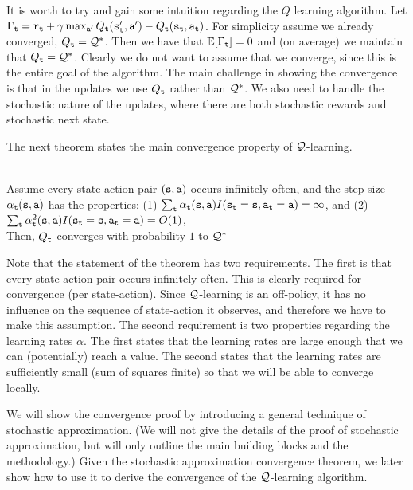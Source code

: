 It is worth to try and gain some intuition regarding the $Q$
learning algorithm. Let $\Gamma_{\tt t}= {\tt r}_{\tt t} + \gamma
\max_{{\tt a}'} Q_{\tt t} ({\tt s}_{{\tt t}}', {\tt a}')-Q_{\tt t}
({\tt s}_{\tt t},{\tt a}_{\tt t})$.
%
For simplicity assume we already converged,
%
$Q_{\tt t}=\mathcal{Q}^*$. Then we have that $\mathbb{E}[\Gamma_{\tt t}]=0$ and (on
average) we maintain that $Q_{\tt t}=\mathcal{Q}^*$.
%
Clearly we do not want to assume that we converge, since this is the
entire goal of the algorithm.
%
The main challenge in showing the convergence is that in the updates
we use $Q_{\tt t}$ rather than $\mathcal{Q}^*$. We also need to handle the
stochastic nature of the updates, where there are both stochastic
rewards and stochastic next state.

The next theorem states the main convergence property of
$\mathcal{Q}$-learning.
\begin{theorem}\ \\
\label{thm:Q-learning} Assume every state-action pair
$({\tt s},{\tt a})$ occurs infinitely often, and the step size
$\alpha_{\tt t}({\tt s},{\tt a})$ has the properties: (1) $\sum_{\tt t}
\alpha_{\tt t}({\tt s},{\tt a})
I({\tt s}_{\tt t}={\tt s},{\tt a}_{\tt t}={\tt a})=\infty $, and (2)
$\sum_{\tt t}
\alpha_{\tt t}^2({\tt s},{\tt a}) I({\tt s}_{\tt t}={\tt s},{\tt a}_{\tt t}={\tt a})=O(1)$,\\
Then, $Q_{\tt t}$ converges with probability $1$ to $\mathcal{Q}^*$
\end{theorem}

Note that the statement of the theorem has two requirements. The
first is that every state-action pair occurs infinitely often.
This is clearly required for convergence (per state-action). Since
$\mathcal{Q}$-learning is an off-policy, it has no influence on the sequence
of state-action it observes, and therefore we have to make this
assumption. The second requirement is two properties regarding the
learning rates $\alpha$. The first states that the learning rates
are large enough that we can (potentially) reach a value. The
second states that the learning rates are sufficiently small (sum of
squares finite) so that we will be able to converge locally.

We will show the convergence proof by introducing a general technique
of stochastic approximation. (We will not give the details of the
proof of stochastic approximation, but will only outline the main
building blocks and the methodology.) Given the stochastic
approximation convergence theorem, we later show how to use it to
derive the convergence of the $\mathcal{Q}$-learning algorithm.





